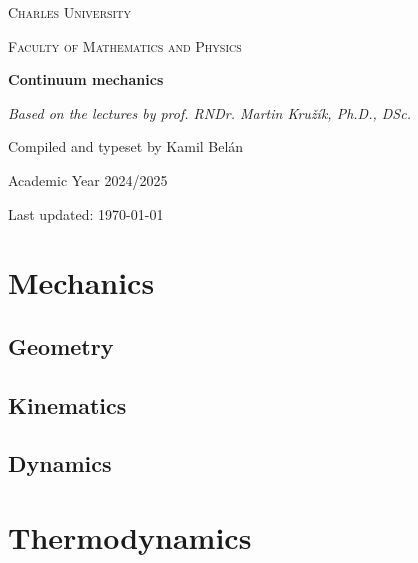 \documentclass[11pt,a4paper]{book}
\begin{document}
\begin{titlepage}
  \centering
  \vspace*{2cm}
  
  {\scshape\LARGE Charles University \par}
  \vspace{0.5cm}
  {\scshape\Large Faculty of Mathematics and Physics\par}
  \vspace{1.5cm}
  
  {\huge\bfseries Continuum mechanics\par}
  \vspace{0.5cm}
  {\Large\itshape Based on the lectures by prof. RNDr. Martin Kružík, Ph.D., DSc.\par}
  
  \vspace{2cm}
  
  \vfill
  
  {\large Compiled and typeset by Kamil Belán\par}
  \vspace{0.5cm}
  {\large Academic Year 2024/2025\par}
  \vspace{0.2cm}
  {\large Last updated: \today\par}
  
\end{titlepage}

\tableofcontents
\newpage 

\chapter{Mechanics}
\label{chap:mechanics}

\section{Geometry}
\label{sec:geometry}

\section{Kinematics}
\label{sec:kinematics}

\section{Dynamics}
\label{sec:dynamics}

\chapter{Thermodynamics}
\label{chap:thermodynamics}
\end{document}

